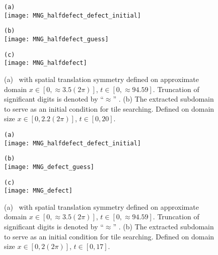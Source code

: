 \begin{description}
{\begin{description}
\end{description}
}

%

\begin{figure}
\begin{minipage}[height=.4\textheight]{.5\textwidth}
\centering
\small{\texttt{(a)}} \\
\texttt{[image: MNG\_halfdefect\_defect\_initial]}
\end{minipage}
\begin{minipage}[height=.4\textheight]{.5\textwidth}
\centering
\small{\texttt{(b)}}\\
\texttt{[image: MNG\_halfdefect\_guess]}
\end{minipage}
\begin{minipage}[height=.1\textheight]{\textwidth}
\centering
\small{\texttt{(c)}}\\
\texttt{[image: MNG\_halfdefect]}
\end{minipage}
\caption{ \label{fig:halfdefect}
(a) \twoT\ with spatial translation symmetry defined on approximate domain $x \in [0,\approx 3.5(2\pi)]$, $t \in [0, \approx 94.59]$.  Truncation of significant digits is denoted by ``$\approx$'' .
(b) The extracted subdomain to serve as an
initial condition for tile searching. Defined on domain size $x \in [0,2.2(2\pi)]$, $t \in [0, 20]$.
}
\end{figure}

\begin{figure}
\begin{minipage}[height=.4\textheight]{.5\textwidth}
\centering
\small{\texttt{(a)}} \\
\texttt{[image: MNG\_halfdefect\_defect\_initial]}
\end{minipage}
\begin{minipage}[height=.4\textheight]{.5\textwidth}
\centering
\small{\texttt{(b)}} \\
\texttt{[image: MNG\_defect\_guess]}
\end{minipage}
\begin{minipage}[height=.1\textheight]{\textwidth}
\centering
\small{\texttt{(c)}}\\
\texttt{[image: MNG\_defect]}
\end{minipage}
\caption{ \label{fig:defect}
(a) \twoT\ with spatial translation symmetry defined on approximate domain $x \in [0,\approx 3.5(2\pi)]$, $t \in [0, \approx 94.59]$. Truncation of significant digits is denoted by ``$\approx$'' .
(b) The extracted subdomain to serve as an
initial condition for tile searching. Defined on domain size $x \in [0,2(2\pi)]$, $t \in [0, 17]$.
}
\end{figure}


\end{description}
